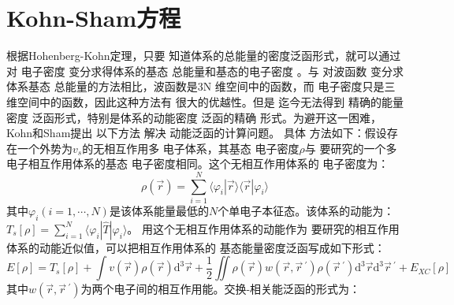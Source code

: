 \section{Kohn-Sham方程}
{根据}Hohenberg-Kohn定理，只要%
{知道}体系的总能量的{密度}泛函形式，就可以通过对%
{电}子密度%
变分求得体系的基态%
{总能量和基态的电}子密度%
。与%
对波函数%
变分求%
体系基态%
{总能量}的方法相比，波函数是3N%
{维空间中的}函数，而%
{电}子密度只是三维{空间中的}函数，因此这种方法有%
{很}大的优越性。但是%
{迄今无法}得到%
精确的能量密度
泛函形式，特别是体系的动能密度
泛函的精确%
{形式。为避开这一困难}，Kohn和Sham\cite{PRA140-1133_1965}提出%
{以下}方法%
解决%
动能泛函的计算问题。%
具体%
方法如下：假设存在一个外势为$v_s$的无相互作用多%
{电}子体系，其基态%
{电}子密度$\rho$与%
{要}研究的一个多电子相互作用体系的基态%
{电}子密度相同。这个无相互作用体系的%
{电}子密度为：
$$\rho(\vec{r})=\sum_{i=1}^{N}\langle\varphi_{i}|\vec{r}\rangle\langle\vec{r}|\varphi_{i}\rangle$$
其中$\varphi_i(i\!=\!1,\cdots,N)$是该体系能量最低的$N$个{单电子}本征态。该体系的动能为：\linebreak $T_{s}[\rho]\!=\!\sum\limits_{i=1}^{N}\langle\varphi_{i}|\hat{T}|\varphi_{i}\rangle$。
用这个无相互作用体系的动能作为%
{要}研究的相互作用体系的动能近似{值}，可以把相互作用体系的%
{基态能量密度泛函}写成如下形式：
\begin{equation}
  \label{eq:dft-1}
E[\rho]=T_{s}[\rho]+\int{v(\vec{r})\rho(\vec{r})\textrm{d}^3\vec{r}}+\frac 12\iint{\rho(\vec{r})w(\vec{r},\vec r\,^{\prime})\rho(\vec r\,^{\prime})\textrm{d}^3\vec{r}\textrm{d}^3\vec r\,^{\prime}}+E_{XC}[\rho]
\end{equation}
其中{$w(\vec r, \vec r\,^{\prime})$为两个电子间的相互作用能。}交换-相关能泛函的形式为：

